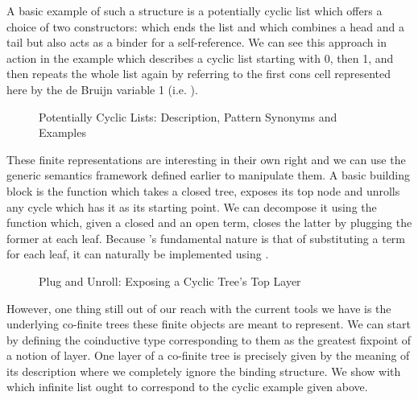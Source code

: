 A basic example of such a structure is a potentially cyclic list which
offers a choice of two constructors: \AIC{[]} which ends the list and
\AIC{\_::\_} which combines a head and a tail but also acts as a binder
for a self-reference. We can see this approach in action in the example
 which describes a cyclic list starting with 0, then 1, and then
repeats the whole list again by referring to the first cons cell
represented here by the de Bruijn variable 1 (i.e.  ).

\begin{figure}[h]
\begin{minipage}{0.55\textwidth}
\end{minipage}\hspace{2em}
\begin{minipage}{0.35\textwidth}
\end{minipage}
\caption{Potentially Cyclic Lists: Description, Pattern Synonyms and Examples}
\end{figure}

These finite representations are interesting in their own right
and we can use the generic semantics framework defined earlier
to manipulate them. A basic building block is the 
function which takes a closed tree, exposes its top node and
unrolls any cycle which has it as its starting point. We can
decompose it using the  function which, given a closed
and an open term, closes the latter by plugging the former at
each  leaf. Because 's fundamental nature
is that of substituting a term for each leaf, it can naturally
be implemented using .

\begin{figure}[h]
\begin{minipage}{0.52\textwidth}
\end{minipage}\hspace{2em}
\begin{minipage}{0.43\textwidth}
\end{minipage}
\caption{Plug and Unroll: Exposing a Cyclic Tree's Top Layer}
\end{figure}

However, one thing still out of our reach with the current tools we have
is the underlying co-finite trees these finite objects are meant
to represent. We can start by defining the coinductive type
corresponding to them as the greatest fixpoint of a notion of
layer. One layer of a co-finite tree is precisely given by the
meaning of its description where we completely ignore the binding
structure. We show with  which infinite list ought to
correspond to the cyclic example  given above.

